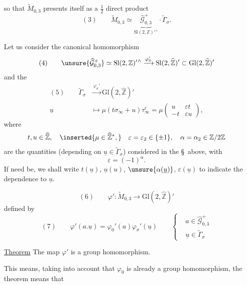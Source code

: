 
so that $\widetilde M_{0,3}$ presents itself as a $\frac12$ direct product
\[
(3)\qquad \widetilde M_{0,3}\simeq\underbrace{\widehat{\mathcal G}_{0,3}^{+}}_{\mathrm{Sl}(2,\mathbb Z)'{}^\wedge}\cdot\widetilde\Gamma_\sigma.
\]

Let us consider the canonical homomorphism
\[
(4)\qquad \unsure{\widehat{\mathcal G}_{0,3}^{+}}\simeq\mathrm{Sl}(2,\mathbb Z)'{}^\wedge\xrightarrow{\varphi_0'}\mathrm{Sl}(2,\widehat{\mathbb Z})'\subset\mathrm{Gl}(2,\widehat{\mathbb Z})'
\]
and the 
\[
\begin{aligned}
(5)\qquad \widetilde\Gamma_\sigma&\xrightarrow{\varphi_\sigma'}\mathrm{Gl}(2,\widehat{\mathbb Z})'\\
\underline u&\longmapsto\mu(t\sigma_\infty+u)\tau_\infty^\varepsilon=\mu\begin{pmatrix}u&\varepsilon t\\-t&\varepsilon u\end{pmatrix},
\end{aligned}
\]
where 
\[
t,u\in\widehat{\mathbb Z},\quad\inserted{\mu\in\widehat{\mathbb Z}^{*},}\quad\varepsilon=\varepsilon_2\in\{\pm1\},\quad\alpha=\alpha_2\in\mathbb Z/2\mathbb Z
\]
are the quantities (depending on $\underline u\in\widetilde\Gamma_\sigma$) considered in the \S\ above, with
\[
\varepsilon=(-1)^\alpha.
\]
If need be, we shall write $t(\underline u)$, $\underline u(u)$, $\unsure{\alpha(\underline u)}$, $\varepsilon(\underline u)$ to indicate the dependence  to $\underline u$.

\[
(6)\qquad\varphi':\widetilde M_{0,3}\longrightarrow\mathrm{Gl}(2,\widehat{\mathbb Z})'
\]
defined by
\[
(7)\qquad\varphi'(a.\underline u)=\varphi_0'(a)\varphi_\sigma'(\underline u)\qquad\left\{\begin{aligned}&a\in\widehat{\mathcal G}_{0,3}^{+}\\&\underline u\in\widetilde\Gamma_\sigma\end{aligned}\right.
\]


\uline{Theorem} The map $\varphi'$ is a group homomorphism.

This means, taking into account that $\varphi_0$ is already a group homomorphism, the theorem means that

